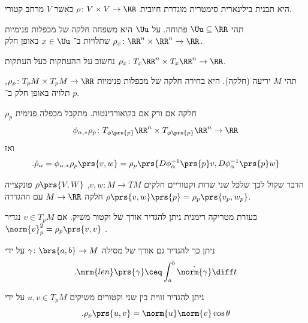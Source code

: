 \documentclass[a4paper,10pt,twoside,openany]{book}
\begin{document}
\begin{definition}
היא תבנית בילינארית סימטרית מוגדרת חיובית
$\rho \colon V\times V \to \RR$
כאשר
$V$
מרחב קטורי.
\end{definition}
\begin{definition}
תהי
$\Uu \subseteq \RR$
פתוחה.
על
$\Uu$
היא משפחה חלקה של מכפלות פנימיות
$\rho_x \colon \RR^n \times \RR^n \to \RR$
שתלויות ב־%
$x \in \Uu$
באופן חלק.
\end{definition}
\begin{remark}
נחשוב על ההעתקות כעל העתקות
$\rho_x \colon T_x \RR^n \times T_x\RR^n \to \RR$.
\end{remark}
\begin{definition}
תהי
$M$
יריעה (חלקה).
היא בחירה חלקה של מכפלות פנימיות
$\rho_p \colon T_p M \times T_p M \to \RR$,
תלויה באופן חלק ב־%
$p$.
\end{definition}
\begin{remark}
$\rho_p$
חלקה אם ורק אם בקואורדינטות.
מתקבל מכפלה פנימית
\[\phi_{\alpha,*} \rho_p \colon T_{\phi\prs{p}}\RR^n \times T_{\phi\prs{p}}\RR^n \to \RR\]
ואז
\begin{align*}
\text{.} \hat{\rho}_{\alpha} = \phi_{\alpha, *}\rho_p\prs{v,w} = \rho_p \prs{D\phi_{\alpha}^{-1}\prs{p} v, D\phi_{\alpha}^{-1}\prs{p} w}
\end{align*}
\end{remark}
\begin{remark}
הדבר שקול לכך שלכל שני שדות וקטוריים חלקים
$v,w \colon M \to TM$,
$\rho\prs{V,W}$
פונקצייה חלקה
$M \to \RR$
עם ההגדרה
$\rho\prs{v,w}\prs{p} = \rho_p \prs{v_p, w_p}$.
\end{remark}

בעזרת מטריקה רימנית ניתן להגדיר אורך של וקטור משיק. אם
$v \in T_p M$
נגדיר
$\norm{v}_p^2 = \rho_p\prs{v,v}$
.

ניתן כך להגדיר גם אורך של מסילה
$\gamma \colon \brs{a,b} \to M$
על ידי
\[\text{.} \mrm{len}\prs{\gamma} \ceq \int_a^b \dot{\norm{\gamma}} \diff t\]

ניתן להגדיר זווית בין שני וקטורים משיקים
$u,v \in T_p M$
על ידי
\[\text{.} \rho_p\prs{u,v} = \norm{u} \norm{v} \cos \theta\]
\end{document}
